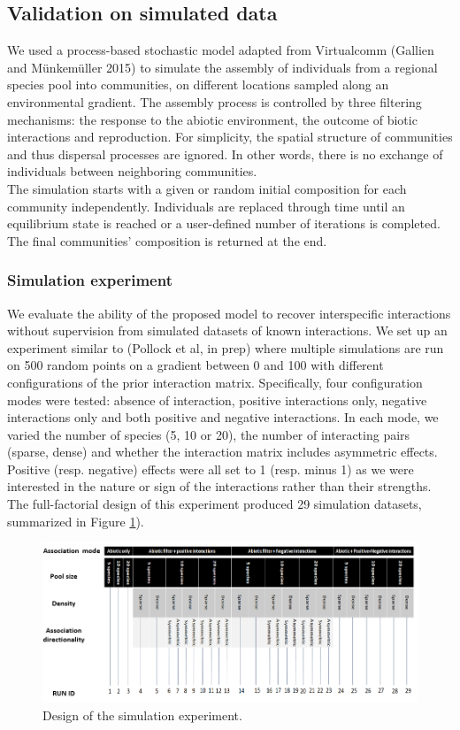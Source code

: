 \documentclass[]{article}
\begin{document}
\subsection{Validation on simulated data}
\noindent We used a process-based stochastic model adapted from Virtualcomm (Gallien and Münkemüller 2015) to simulate the assembly of individuals from a regional species pool into communities, on different locations sampled along an environmental gradient. The assembly process is controlled by three filtering mechanisms: the response to the abiotic environment, the outcome of biotic interactions and reproduction.  For simplicity, the spatial structure of communities and thus dispersal processes are ignored. In other words, there is no exchange of individuals between neighboring communities. \\

\noindent The simulation starts with a given or random initial composition for each community independently. Individuals are replaced through time until an equilibrium state is reached or a user-defined number of iterations is completed. The final communities’ composition is returned at the end.

\subsubsection{Simulation experiment}
We evaluate the ability of the proposed model to recover interspecific interactions without supervision from simulated datasets of known interactions. We set up an experiment similar to (Pollock et al, in prep) where multiple simulations are run on 500 random points on a gradient between 0 and 100 with different configurations of the prior interaction matrix. Specifically, four configuration modes were tested: absence of interaction, positive interactions only, negative interactions only and both positive and negative interactions. In each mode, we varied the number of species (5, 10 or 20), the number of interacting pairs (sparse, dense) and whether the interaction matrix includes asymmetric effects. Positive (resp. negative) effects were all set to 1 (resp. minus 1) as we were interested in the nature or sign of the interactions rather than their strengths. The full-factorial design of this experiment produced 29 simulation datasets, summarized in Figure \ref{simexp}).

\begin{figure}[h]
	\centering
	\includegraphics[scale=0.65]{simexp}
	\caption{Design of the simulation experiment.}
	\label{simexp}
\end{figure} 
\end{document}
